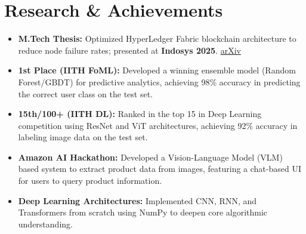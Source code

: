 \documentclass[9pt,a4paper]{extarticle}
\begin{document}
\section{Research \& Achievements}
\begin{itemize}[leftmargin=*, nosep]
    \item \textbf{M.Tech Thesis:} Optimized HyperLedger Fabric blockchain architecture to reduce node failure rates; presented at \textbf{Indosys 2025}. \hfill \href{https://arxiv.org/}{arXiv}
    \item \textbf{1st Place (IITH FoML):} Developed a winning ensemble model (Random Forest/GBDT) for predictive analytics, achieving 98\% accuracy in predicting the correct user class on the test set.
    \item \textbf{15th/100+ (IITH DL):} Ranked in the top 15 in Deep Learning competition using ResNet and ViT architectures, achieving 92\% accuracy in labeling image data on the test set.
    \item \textbf{Amazon AI Hackathon:} Developed a Vision-Language Model (VLM) based system to extract product data from images, featuring a chat-based UI for users to query product information.
    \item \textbf{Deep Learning Architectures:} Implemented CNN, RNN, and Transformers from scratch using NumPy to deepen core algorithmic understanding.
\end{itemize}
\end{document}
